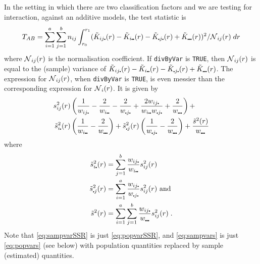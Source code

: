 \documentclass[12pt]{article}
\newcommand{\pt}{\mbox{\scalebox{0.4}{$\bullet$}}}
\newcommand{\tils}{\mbox{$\tilde{s}$}}
\newcommand{\sco}{\mbox{$\cal N$}}
\begin{document}
In the setting in which there are two classification factors and
we are testing for interaction, against an additive models, the
test statistic is
\[
T_{AB} = \sum_{i=1}^a \sum_{j=1}^b n_{ij} \int_{r_0}^{r_1} (\tilde{K}_{ij \pt}(r) -
   \tilde{K}_{i \pt \pt}(r) - \tilde{K}_{\pt j \pt}(r) +
   \tilde{K}_{\pt \pt \pt}(r))^2/\sco_{ij}(r) \; dr
\]
where $\sco_{ij}(r)$ is the normalisation coefficient.  If
\texttt{divByVar} is \texttt{TRUE}, then $\sco_{ij}(r)$ is equal to
the (sample) variance of $\tilde{K}_{ij\pt}(r) - \tilde{K}_{i\pt \pt}(r)
- \tilde{K}_{\pt j \pt}(r) + \tilde{K}_{\pt \pt \pt}(r)$.  The expression for
$\sco_{ij}(r)$, when \texttt{divByVar} is \texttt{TRUE}, is
even messier than the corresponding expression for $\sco_{i}(r)$.
It is given by
\begin{equation}
\label{eq:sampvarSSR}
\begin{split}
s_{ij}^2(r) &\left ( \frac{1}{w_{i j \pt}} -
                                      \frac{2}{w_{i \pt \pt}} -
                                      \frac{2}{w_{\pt j \pt}} +
                                      \frac{2w_{ij \pt}}{w_{i \pt \pt} w_{\pt j \pt}} +
                                      \frac{2}{w_{\pt \pt \pt}} \right )+ \\
               \tils^2_{i \pt}(r) &\left ( \frac{1}{w_{i \pt \pt}} -
                                   \frac{2}{w_{\pt \pt \pt}} \right )+
               \tils^2_{\pt j}(r) \left (\frac{1}{w_{\pt j \pt}} -
                                   \frac{2}{w_{\pt \pt \pt}} \right )+
                            \frac{\tilde{s}^2(r)}{w_{\pt \pt \pt}}
\end{split}
\end{equation}
where
\begin{equation}
\label{eq:sampvars}
\begin{split}
\tils_{i \pt}^2(r) &= \sum_{j=1}^b \frac{w_{ij \pt}}{w_{i \pt \pt}} s^2_{ij}(r) \\
\tils_{\pt j}^2(r) &= \sum_{i=1}^a \frac{w_{ij \pt}}{w_{\pt j \pt}} s^2_{ij}(r)
                        \mbox{~and}\\
\tils^2(r) &= \sum_{i=1}^a \sum_{j=1}^b \frac{w_{i j \pt}}{w_{\pt \pt \pt}}
                                          s^2_{ij}(r) \; .
\end{split}
\end{equation}
Note that \eqref{eq:sampvarSSR} is just \eqref{eq:popvarSSR},
and \eqref{eq:sampvars} is just \eqref{eq:popvars} (see below)
with population quantities replaced by sample (estimated) quantities.
\end{document}
